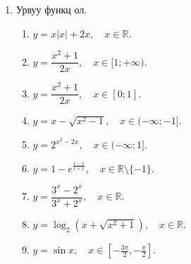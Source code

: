 \begin{enumerate}
\begin{enumerate}
  \item $f(x) = \sin^2 x - 4\sin x + 3$
  \item $f(x) = \sqrt{8 - 2x - x^2}$
  \item $f(x) = \sqrt{2x - 1 - x^2}$
  \item $f(x) = 2^{x^2+4x+5}$
  \item $f(x) = \log_{3}(5 + 4x - x^2)$
  \item $f(x) = \sqrt{2 \log x - (\log x)^2}$
  \item $f'(x) = \sin x - 5\cos x$
  \item $f(x) = \dfrac{\sin x - \cos x}{\sin x + \cos x}$
  \item $f(x) = \log_{2}(\cos x + \sin^2 x)$
  \item $f(x) = 1 - \sqrt{9 - \sqrt{2x^2 + 6\sqrt{2x} + 9}}$
  \item $f(x) =
    \begin{cases}
      2x^2 + 8x + 6, & x < -1, \\
      3\sqrt{x+1}, & x \geq -1
    \end{cases}$
  \item $f(x) =
    \begin{cases}
      \dfrac{8}{x}, & x \leq -2, \\
      x^3 + 4, & -2 < x \leq 0, \\
      \dfrac{4}{x^2 + 1}, & x > 0
    \end{cases}$
  \item $f(x) = \dfrac{x^4 + 6x^3 - 27x - 162}{x^2 + 3x - 18}$
\end{enumerate}
\item Урвуу функц ол.
\begin{enumerate}
    \item $y = x|x| + 2x, \quad x \in \mathbb{R}.$
  \item $y = \dfrac{x^2 + 1}{2x}, \quad x \in [1; +\infty).$
  \item $y = \dfrac{x^2 + 1}{2x}, \quad x \in [0; 1].$
  \item $y = x - \sqrt{x^2 - 1}, \quad x \in (-\infty; -1].$
  \item $y = 2^{x^2 - 2x}, \quad x \in (-\infty; 1].$
  \item $y = 1 - e^{\tfrac{1-x}{1+x}}, \quad x \in \mathbb{R} \setminus \{-1\}.$
  \item $y = \dfrac{3^x - 2^x}{3^x + 2^x}, \quad x \in \mathbb{R}.$
  \item $y = \log_{2}\!\left(x + \sqrt{x^2+1}\right), \quad x \in \mathbb{R}.$
  \item $y = \sin x, \quad x \in \left[-\tfrac{3\pi}{2}, -\tfrac{\pi}{2}\right].$

\end{enumerate}
\end{enumerate}
